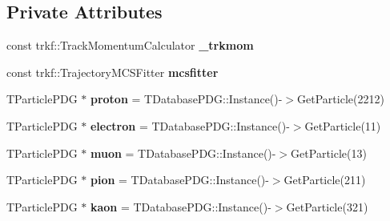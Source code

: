 \subsection*{Private Attributes}
\begin{DoxyCompactItemize}
\item 
const trkf\+::\+Track\+Momentum\+Calculator {\bfseries \+\_\+trkmom}\hypertarget{classselection_1_1CC0piNpSelection_a320b14dcb3cc1674048bc4f0dd18fa45}{}\label{classselection_1_1CC0piNpSelection_a320b14dcb3cc1674048bc4f0dd18fa45}

\item 
const trkf\+::\+Trajectory\+M\+C\+S\+Fitter {\bfseries mcsfitter}\hypertarget{classselection_1_1CC0piNpSelection_aab7c56654d30a9cc5ad2dbe09a3e12c9}{}\label{classselection_1_1CC0piNpSelection_aab7c56654d30a9cc5ad2dbe09a3e12c9}

\item 
T\+Particle\+P\+DG $\ast$ {\bfseries proton} = T\+Database\+P\+D\+G\+::\+Instance()-\/$>$Get\+Particle(2212)\hypertarget{classselection_1_1CC0piNpSelection_a721706e2b68efe51225fa6388bc184d1}{}\label{classselection_1_1CC0piNpSelection_a721706e2b68efe51225fa6388bc184d1}

\item 
T\+Particle\+P\+DG $\ast$ {\bfseries electron} = T\+Database\+P\+D\+G\+::\+Instance()-\/$>$Get\+Particle(11)\hypertarget{classselection_1_1CC0piNpSelection_ad04f8899cec1c9c54e720126e61a872f}{}\label{classselection_1_1CC0piNpSelection_ad04f8899cec1c9c54e720126e61a872f}

\item 
T\+Particle\+P\+DG $\ast$ {\bfseries muon} = T\+Database\+P\+D\+G\+::\+Instance()-\/$>$Get\+Particle(13)\hypertarget{classselection_1_1CC0piNpSelection_ae1161170f7b46e368ad608924cc412fd}{}\label{classselection_1_1CC0piNpSelection_ae1161170f7b46e368ad608924cc412fd}

\item 
T\+Particle\+P\+DG $\ast$ {\bfseries pion} = T\+Database\+P\+D\+G\+::\+Instance()-\/$>$Get\+Particle(211)\hypertarget{classselection_1_1CC0piNpSelection_a7237863b296cd8e3bf68dccb4d4122bb}{}\label{classselection_1_1CC0piNpSelection_a7237863b296cd8e3bf68dccb4d4122bb}

\item 
T\+Particle\+P\+DG $\ast$ {\bfseries kaon} = T\+Database\+P\+D\+G\+::\+Instance()-\/$>$Get\+Particle(321)\hypertarget{classselection_1_1CC0piNpSelection_a1881dd29c46973578cb8b48a726f34f0}{}\label{classselection_1_1CC0piNpSelection_a1881dd29c46973578cb8b48a726f34f0}


\end{DoxyCompactItemize}
